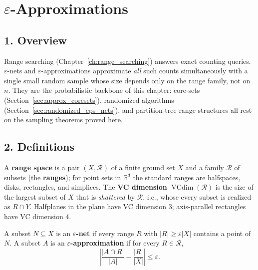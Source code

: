 
\section{\texorpdfstring{$\varepsilon$}{epsilon}-Approximations}
\label{sec:approx_eps}

\subsection{1. Overview}

Range searching (Chapter~\ref{ch:range_searching}) answers exact counting
queries. $\varepsilon$-nets and $\varepsilon$-approximations approximate
\emph{all} such counts simultaneously with a single small random sample
whose size depends only on the range family, not on $n$. They are the
probabilistic backbone of this chapter: core-sets
(Section~\ref{sec:approx_coresets}), randomized algorithms
(Section~\ref{sec:randomized_eps_nets}), and partition-tree range structures
all rest on the sampling theorems proved here.

\subsection{2. Definitions}

\begin{definition}\label{def:approx_range_space}
  A \textbf{range space} is a pair $(X, \mathcal{R})$ of a finite ground set
  $X$ and a family $\mathcal{R}$ of subsets (the \textbf{ranges}); for point
  sets in $\mathbb{R}^d$ the standard ranges are halfspaces, disks,
  rectangles, and simplices. The \textbf{VC dimension}
  $\operatorname{VCdim}(\mathcal{R})$ is the size of the largest subset of
  $X$ that is \emph{shattered} by $\mathcal{R}$, i.e., whose every subset is
  realized as $R \cap Y$. Halfplanes in the plane have VC dimension $3$;
  axis-parallel rectangles have VC dimension $4$.
\end{definition}

\begin{definition}\label{def:approx_eps_net}
  A subset $N \subseteq X$ is an \textbf{$\varepsilon$-net} if every range
  $R$ with $|R| \geq \varepsilon |X|$ contains a point of $N$. A subset $A$
  is an \textbf{$\varepsilon$-approximation} if for every
  $R \in \mathcal{R}$,
  \[
    \left|\frac{|A \cap R|}{|A|} - \frac{|R|}{|X|}\right| \leq \varepsilon .
  \]
\end{definition}

